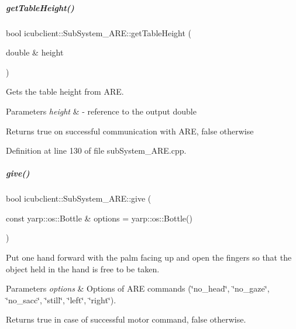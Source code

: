 \mbox{\label{group__icubclient__subsystems_a192608cd2b7f3956f2a2a2c89ecc9c9f}} 
\subparagraph{\texorpdfstring{get\+Table\+Height()}{getTableHeight()}}
{\footnotesize\ttfamily bool icubclient\+::\+Sub\+System\+\_\+\+A\+R\+E\+::get\+Table\+Height (\begin{DoxyParamCaption}\item[{double \&}]{height }\end{DoxyParamCaption})}



Gets the table height from A\+RE. 


\begin{DoxyParams}{Parameters}
{\em height} & -\/ reference to the output double \\
\hline
\end{DoxyParams}
\begin{DoxyReturn}{Returns}
true on successful communication with A\+RE, false otherwise 
\end{DoxyReturn}


Definition at line 130 of file sub\+System\+\_\+\+A\+R\+E.\+cpp.

\mbox{\label{group__icubclient__subsystems_aca9d66bebcb9a4c81b8523e45a39f693}} 
\subparagraph{\texorpdfstring{give()}{give()}}
{\footnotesize\ttfamily bool icubclient\+::\+Sub\+System\+\_\+\+A\+R\+E\+::give (\begin{DoxyParamCaption}\item[{const yarp\+::os\+::\+Bottle \&}]{options = {\ttfamily yarp\+:\+:os\+:\+:Bottle()} }\end{DoxyParamCaption})}



Put one hand forward with the palm facing up and open the fingers so that the object held in the hand is free to be taken. 


\begin{DoxyParams}{Parameters}
{\em options} & Options of A\+RE commands (\char`\"{}no\+\_\+head\char`\"{}, \char`\"{}no\+\_\+gaze\char`\"{}, \char`\"{}no\+\_\+sacc\char`\"{}, \char`\"{}still\char`\"{}, \char`\"{}left\char`\"{}, \char`\"{}right\char`\"{}). \\
\hline
\end{DoxyParams}
\begin{DoxyReturn}{Returns}
true in case of successful motor command, false otherwise. 
\end{DoxyReturn}


